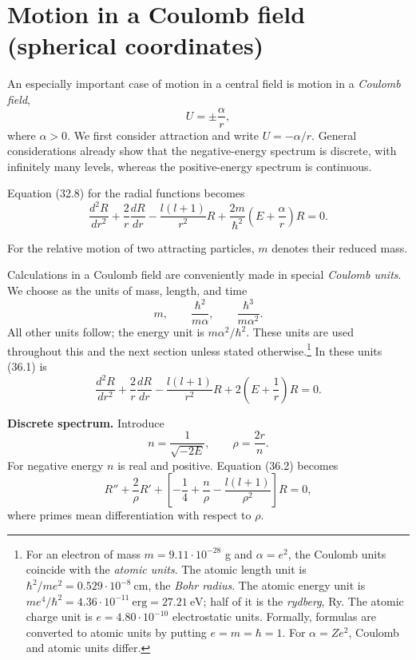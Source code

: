\section{Motion in a Coulomb field (spherical coordinates)}

An especially important case of motion in a central field is motion in a
\emph{Coulomb field},
\[U=\pm\frac\alpha r,\]
where $\alpha>0$. We first consider attraction and write $U=-\alpha/r$.
General considerations already show that the negative-energy spectrum is
discrete, with infinitely many levels, whereas the positive-energy spectrum
is continuous.

Equation (32.8) for the radial functions becomes
\begin{equation}
 \frac{d^2R}{dr^2}+\frac2r\frac{dR}{dr}-\frac{l(l+1)}{r^2}R
 +\frac{2m}{\hbar^2}\left(E+\frac\alpha r\right)R=0. \tag{36.1}
\end{equation}

For the relative motion of two attracting particles, $m$ denotes their
reduced mass.

Calculations in a Coulomb field are conveniently made in special
\emph{Coulomb units}. We choose as the units of mass, length, and time
\[m,\qquad \frac{\hbar^2}{m\alpha},\qquad\frac{\hbar^3}{m\alpha^2}.\]
All other units follow; the energy unit is $m\alpha^2/\hbar^2$. These units
are used throughout this and the next section unless stated otherwise.\footnote{For an electron of mass $m=9.11\cdot10^{-28}$ g and $\alpha=e^2$,
the Coulomb units coincide with the \emph{atomic units}. The atomic length
unit is $\hbar^2/me^2=0.529\cdot10^{-8}\ \text{cm}$, the \emph{Bohr radius}.
The atomic energy unit is
$me^4/\hbar^2=4.36\cdot10^{-11}\ \text{erg}=27.21\ \text{eV}$; half of it is
the \emph{rydberg}, Ry. The atomic charge unit is
$e=4.80\cdot10^{-10}$ electrostatic units. Formally, formulas are converted
to atomic units by putting $e=m=\hbar=1$. For $\alpha=Ze^2$, Coulomb and
atomic units differ.}
In these units (36.1) is
\begin{equation}
 \frac{d^2R}{dr^2}+\frac2r\frac{dR}{dr}-\frac{l(l+1)}{r^2}R
 +2\left(E+\frac1r\right)R=0. \tag{36.2}
\end{equation}

\textbf{Discrete spectrum.} Introduce
\begin{equation}n=\frac1{\sqrt{-2E}},\qquad\rho=\frac{2r}{n}.\tag{36.3}\end{equation}
For negative energy $n$ is real and positive. Equation (36.2) becomes
\begin{equation}
 R''+\frac2\rho R'+\left[-\frac14+\frac n\rho-\frac{l(l+1)}{\rho^2}\right]R=0,
 \tag{36.4}
\end{equation}
where primes mean differentiation with respect to $\rho$.

